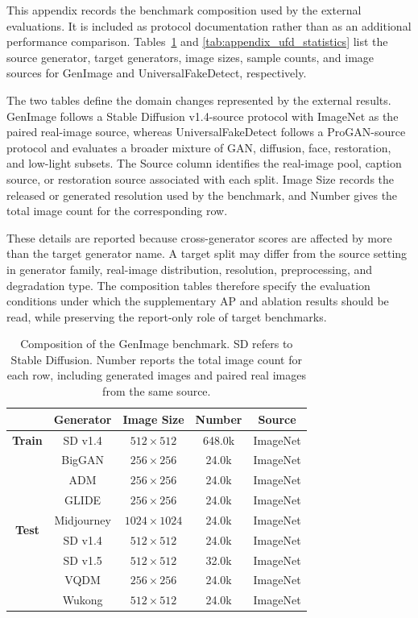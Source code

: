 \documentclass[letterpaper,journal]{IEEEtran}
\begin{document}
This appendix records the benchmark composition used by the external evaluations. It is included as protocol documentation rather than as an additional performance comparison. Tables~\ref{tab:appendix_genimage_statistics} and \ref{tab:appendix_ufd_statistics} list the source generator, target generators, image sizes, sample counts, and image sources for GenImage and UniversalFakeDetect, respectively.

The two tables define the domain changes represented by the external results. GenImage follows a Stable Diffusion v1.4-source protocol with ImageNet as the paired real-image source, whereas UniversalFakeDetect follows a ProGAN-source protocol and evaluates a broader mixture of GAN, diffusion, face, restoration, and low-light subsets. The Source column identifies the real-image pool, caption source, or restoration source associated with each split. Image Size records the released or generated resolution used by the benchmark, and Number gives the total image count for the corresponding row.

These details are reported because cross-generator scores are affected by more than the target generator name. A target split may differ from the source setting in generator family, real-image distribution, resolution, preprocessing, and degradation type. The composition tables therefore specify the evaluation conditions under which the supplementary AP and ablation results should be read, while preserving the report-only role of target benchmarks.
\begin{table}[!t]
\caption{Composition of the GenImage benchmark. SD refers to Stable Diffusion. Number reports the total image count for each row, including generated images and paired real images from the same source.}
\label{tab:appendix_genimage_statistics}
\centering
\small
\renewcommand{\arraystretch}{1.04}
\setlength{\tabcolsep}{4.0pt}
\begin{tabular}{@{}c|cccc@{}}
\toprule
& \textbf{Generator} & \textbf{Image Size} & \textbf{Number} & \textbf{Source} \\
\midrule
\textbf{Train} & SD v1.4 \cite{rombach2022ldm} & $512\times512$ & 648.0k & ImageNet \cite{deng2009imagenet} \\
\midrule
\multirow{8}{*}{\textbf{Test}}
& BigGAN \cite{brock2019biggan} & $256\times256$ & 24.0k & ImageNet \\
& ADM \cite{dhariwal2021diffusion} & $256\times256$ & 24.0k & ImageNet \\
& GLIDE \cite{nichol2022glide} & $256\times256$ & 24.0k & ImageNet \\
& Midjourney \cite{midjourney2023} & $1024\times1024$ & 24.0k & ImageNet \\
& SD v1.4 & $512\times512$ & 24.0k & ImageNet \\
& SD v1.5 & $512\times512$ & 32.0k & ImageNet \\
& VQDM \cite{gu2022vqdm} & $256\times256$ & 24.0k & ImageNet \\
& Wukong \cite{wukong2023} & $512\times512$ & 24.0k & ImageNet \\
\bottomrule
\end{tabular}
\end{table}
\end{document}
